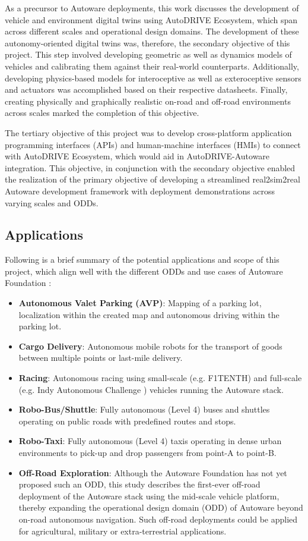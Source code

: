 As a precursor to Autoware deployments, this work discusses the development of vehicle and environment digital twins using AutoDRIVE Ecosystem, which span across different scales and operational design domains. The development of these autonomy-oriented digital twins was, therefore, the secondary objective of this project. This step involved developing geometric as well as dynamics models of vehicles and calibrating them against their real-world counterparts. Additionally, developing physics-based models for interoceptive as well as exteroceptive sensors and actuators was accomplished based on their respective datasheets. Finally, creating physically and graphically realistic on-road and off-road environments across scales marked the completion of this objective.

The tertiary objective of this project was to develop cross-platform application programming interfaces (APIs) and human-machine interfaces (HMIs) to connect with AutoDRIVE Ecosystem, which would aid in AutoDRIVE-Autoware integration. This objective, in conjunction with the secondary objective enabled the realization of the primary objective of developing a streamlined real2sim2real Autoware development framework with deployment demonstrations across varying scales and ODDs.

\hypertarget{Applications}{%
\subsection{Applications}\label{Applications}}

Following is a brief summary of the potential applications and scope of this project, which align well with the different ODDs and use cases of Autoware Foundation \cite{AutowareOverview}:

\begin{itemize}
    \item \textbf{Autonomous Valet Parking (AVP)}: Mapping of a parking lot, localization within the created map and autonomous driving within the parking lot.
    \item \textbf{Cargo Delivery}: Autonomous mobile robots for the transport of goods between multiple points or last-mile delivery.
    \item \textbf{Racing}: Autonomous racing using small-scale (e.g. F1TENTH) and full-scale (e.g. Indy Autonomous Challenge \cite{IAC}) vehicles running the Autoware stack.
    \item \textbf{Robo-Bus/Shuttle}: Fully autonomous (Level 4) buses and shuttles operating on public roads with predefined routes and stops.
    \item \textbf{Robo-Taxi}: Fully autonomous (Level 4) taxis operating in dense urban environments to pick-up and drop passengers from point-A to point-B.
    \item \textbf{Off-Road Exploration}: Although the Autoware Foundation has not yet proposed such an ODD, this study describes the first-ever off-road deployment of the Autoware stack using the mid-scale vehicle platform, thereby expanding the operational design domain (ODD) of Autoware beyond on-road autonomous navigation. Such off-road deployments could be applied for agricultural, military or extra-terrestrial applications.
\end{itemize}
